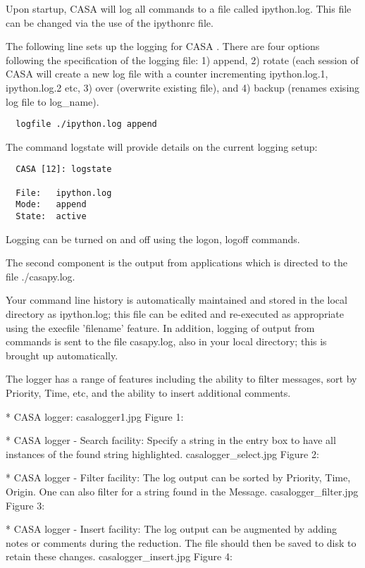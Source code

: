 Upon startup, CASA will log all commands to a file called
ipython.log. This file can be changed via the use of the ipythonrc
file. 
 
The following line sets up the logging for CASA . There are four
options following the specification of the logging file: 1) append, 2)
rotate (each session of CASA will create a new log file with a counter
incrementing ipython.log.1, ipython.log.2 etc, 3) over (overwrite
existing file), and 4) backup (renames exising log file to log\_name).

\small
\begin{verbatim}
  logfile ./ipython.log append
\end{verbatim}
\normalsize

The command logstate will provide details on the current logging setup:

\small
\begin{verbatim}
  CASA [12]: logstate

  File:   ipython.log
  Mode:   append
  State:  active
\end{verbatim}
\normalsize

Logging can be turned on and off using the logon, logoff commands.

The second component is the output from applications which is directed
to the file ./casapy.log. 

Your command line history is automatically maintained and stored in
the local directory as ipython.log; this file can be edited and
re-executed as appropriate using the execfile 'filename' feature. In
addition, logging of output from commands is sent to the file
casapy.log, also in your local directory; this is brought up
automatically. 

The logger has a range of features including the ability to filter
messages, sort by Priority, Time, etc, and the ability to insert
additional comments. 

* CASA logger:
casalogger1.jpg
Figure 1:

* CASA logger - Search facility: Specify a string in the entry box to
have all instances of the found string highlighted. 
casalogger\_select.jpg
Figure 2:

* CASA logger - Filter facility: The log output can be sorted by
Priority, Time, Origin. One can also filter for a string found in the
Message. 
casalogger\_filter.jpg
Figure 3:

* CASA logger - Insert facility: The log output can be augmented by
adding notes or comments during the reduction. The file should then be
saved to disk to retain these changes. 
casalogger\_insert.jpg
Figure 4:

